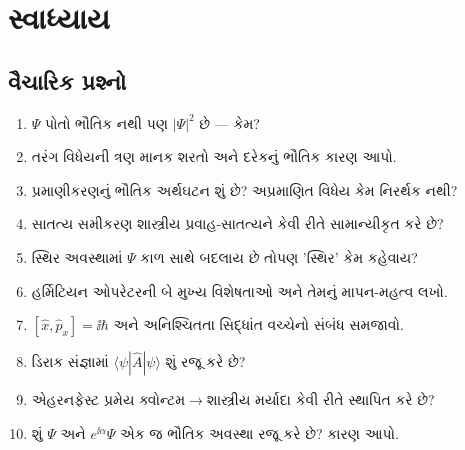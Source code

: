 \section{સ્વાધ્યાય}

\subsection{વૈચારિક પ્રશ્નો}
\begin{enumerate}[label=\textbf{Q\arabic*.}]
  \item $\Psi$ પોતો ભૌતિક નથી પણ $|\Psi|^2$ છે — કેમ?
  \item તરંગ વિધેયની ત્રણ માનક શરતો અને દરેકનું ભૌતિક કારણ આપો.
  \item પ્રમાણીકરણનું ભૌતિક અર્થઘટન શું છે? અપ્રમાણિત વિધેય કેમ નિરર્થક નથી?
  \item સાતત્ય સમીકરણ શાસ્ત્રીય પ્રવાહ-સાતત્યને કેવી રીતે સામાન્યીકૃત કરે છે?
  \item સ્થિર અવસ્થામાં $\Psi$ કાળ સાથે બદલાય છે તોપણ 'સ્થિર' કેમ કહેવાય?
  \item હર્મિટિયન ઓપરેટરની બે મુખ્ય વિશેષતાઓ અને તેમનું માપન-મહત્વ લખો.
  \item $[\hat x,\hat p_x]=\ii\hbar$ અને અનિશ્ચિતતા સિદ્ધાંત વચ્ચેનો સંબંધ સમજાવો.
  \item ડિરાક સંજ્ઞામાં $\langle\psi|\hat A|\psi\rangle$ શું રજૂ કરે છે?
  \item એહરનફેસ્ટ પ્રમેય ક્વોન્ટમ$\to$શાસ્ત્રીય મર્યાદા કેવી રીતે સ્થાપિત કરે છે?
  \item શું $\Psi$ અને $e^{\ii\alpha}\Psi$ એક જ ભૌતિક અવસ્થા રજૂ કરે છે? કારણ આપો.
\end{enumerate}

